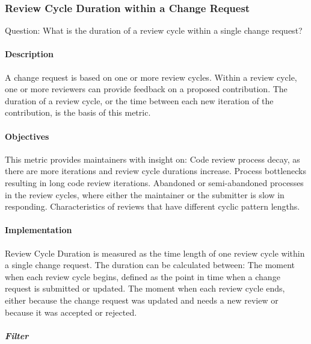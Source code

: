 \hypertarget{review-cycle-duration-within-a-change-request}{%
\subsubsection{Review Cycle Duration within a Change
Request}\label{review-cycle-duration-within-a-change-request}}

Question: What is the duration of a review cycle within a single change
request?

\hypertarget{description}{%
\paragraph{Description}\label{description}}

A change request is based on one or more review cycles. Within a review
cycle, one or more reviewers can provide feedback on a proposed
contribution. The duration of a review cycle, or the time between each
new iteration of the contribution, is the basis of this metric.

\hypertarget{objectives}{%
\paragraph{Objectives}\label{objectives}}

This metric provides maintainers with insight on: Code review process
decay, as there are more iterations and review cycle durations increase.
Process bottlenecks resulting in long code review iterations. Abandoned
or semi-abandoned processes in the review cycles, where either the
maintainer or the submitter is slow in responding. Characteristics of
reviews that have different cyclic pattern lengths.

\hypertarget{implementation}{%
\paragraph{Implementation}\label{implementation}}

Review Cycle Duration is measured as the time length of one review cycle
within a single change request. The duration can be calculated between:
The moment when each review cycle begins, defined as the point in time
when a change request is submitted or updated. The moment when each
review cycle ends, either because the change request was updated and
needs a new review or because it was accepted or rejected.

\hypertarget{filter}{%
\subparagraph{Filter}\label{filter}}

